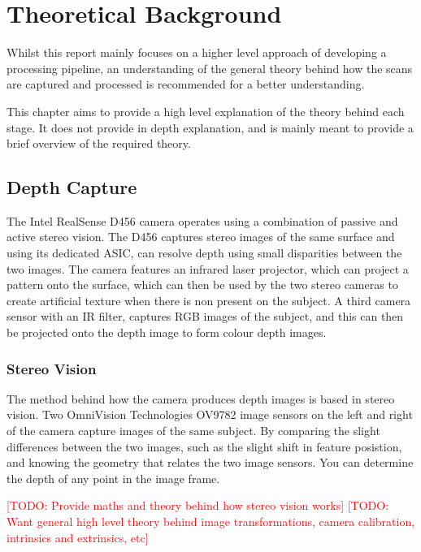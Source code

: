 \chapter{Theoretical Background}
\label{ch:theory}
\providecommand{\todo}[1]{\textcolor{red}{[TODO: #1]}}
Whilst this report mainly focuses on a higher level approach of developing a processing pipeline, an understanding of the general theory behind how the scans are captured and processed is recommended for a better understanding. 

This chapter aims to provide a high level explanation of the theory behind each stage. It does not provide in depth explanation, and is mainly meant to provide a brief overview of the required theory.

\section{Depth Capture}
The Intel RealSense D456 camera operates using a combination of passive and active stereo vision. The D456 captures stereo images of the same surface and using its dedicated ASIC, can resolve depth using small disparities between the two images. The camera features an infrared laser projector, which can project a pattern onto the surface, which can then be used by the two stereo cameras to create artificial texture when there is non present on the subject. A third camera sensor with an IR filter, captures RGB images of the subject, and this can then be projected onto the depth image to form colour depth images.

\subsection{Stereo Vision}
The method behind how the camera produces depth images is based in stereo vision. Two OmniVision Technologies OV9782 image sensors on the left and right of the camera capture images of the same subject. By comparing the slight differences between the two images, such as the slight shift in feature posistion, and knowing the geometry that relates the two image sensors. You can determine the depth of any point in the image frame. 

\todo{Provide maths and theory behind how stereo vision works}
\todo{Want general high level theory behind image transformations, camera calibration, intrinsics and extrinsics, etc}

